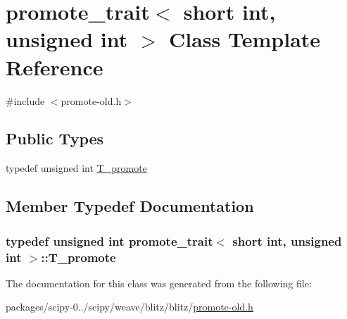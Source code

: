 \hypertarget{classpromote__trait_3_01short_01int_00_01unsigned_01int_01_4}{}\section{promote\+\_\+trait$<$ short int, unsigned int $>$ Class Template Reference}
\label{classpromote__trait_3_01short_01int_00_01unsigned_01int_01_4}


{\ttfamily \#include $<$promote-\/old.\+h$>$}

\subsection*{Public Types}
\begin{DoxyCompactItemize}
\item 
typedef unsigned int \hyperlink{classpromote__trait_3_01short_01int_00_01unsigned_01int_01_4_a187483ec3c4cc0cd4732e793ea9fbaea}{T\+\_\+promote}
\end{DoxyCompactItemize}


\subsection{Member Typedef Documentation}
\hypertarget{classpromote__trait_3_01short_01int_00_01unsigned_01int_01_4_a187483ec3c4cc0cd4732e793ea9fbaea}{}
\subsubsection[{T\+\_\+promote}]{\setlength{\rightskip}{0pt plus 5cm}typedef unsigned int {\bf promote\+\_\+trait}$<$ short int, unsigned int $>$\+::{\bf T\+\_\+promote}}\label{classpromote__trait_3_01short_01int_00_01unsigned_01int_01_4_a187483ec3c4cc0cd4732e793ea9fbaea}


The documentation for this class was generated from the following file\+:\begin{DoxyCompactItemize}
\item 
packages/scipy-\/0../scipy/weave/blitz/blitz/\hyperlink{promote-old_8h}{promote-\/old.\+h}\end{DoxyCompactItemize}
